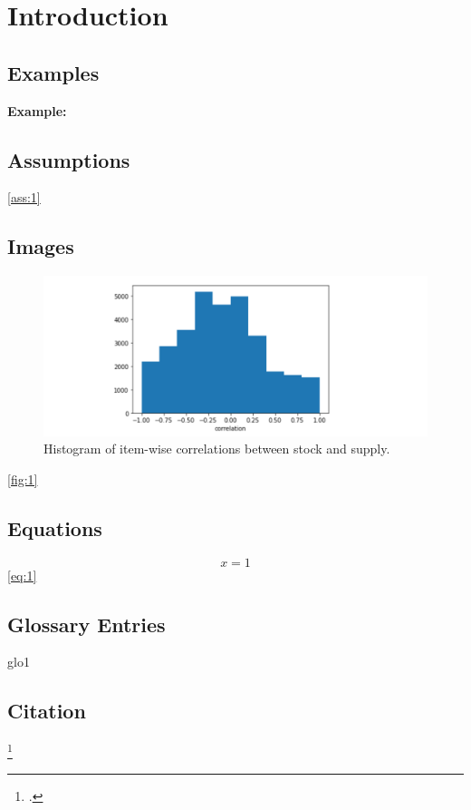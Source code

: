 
\chapter{Introduction} %

\label{Chapter1} %

\section{Examples}

\lipsum[1-4]
\begin{shaded}
\noindent \textbf{Example:}
\lipsum[1]
\end{shaded}

\lipsum[5-6]

\section{Assumptions}
\begin{assumption} \label{ass:1}
	\lipsum[1]
\end{assumption}

\lipsum[1] 
\autoref{ass:1}

\section{Images}
\begin{figure}[h!]
	\includegraphics[width=\linewidth]{Figures/1.png}
	\caption{Histogram of item-wise correlations between stock and supply.}
	\label{fig:1}
\end{figure}
\lipsum[1] \autoref{fig:1}

\section{Equations}
\begin{equation} \label{eq:1}
	x=1
\end{equation}
\lipsum[1] \autoref{eq:1}

\section{Glossary Entries}
\lipsum[1]
\gls{glo1}

\section{Citation}
\lipsum[1]
\footcite{grimberg}



